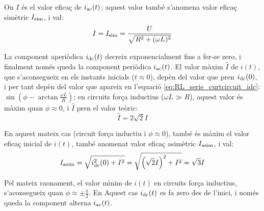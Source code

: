 On $I$ \'{e}s el valor efica\c{c} de $i_\mathrm{ac}(t)$; aquest valor tamb\'{e} s'anomena valor efica\c{c} sim\`{e}tric $I_\mathrm{sim}$, i val:
\begin{equation}
    I = I_\mathrm{sim} =\frac{U}{\sqrt{R^2+(\omega L)^2}}
    \label{eq:RL_serie_curtcircuit_I}
\end{equation}

La component aperi\`{o}dica $i_\mathrm{dc}(t)$ decreix exponencialment fins a fer-se zero, i finalment nom\'{e}s queda la component peri\`{o}dica $i_\mathrm{ac}(t)$. El valor m\`{a}xim $\hat{I}$ de $i(t)$, que s'aconsegueix en els instants inicials ($t\approx 0$), dep\`{e}n del valor que pren $i_\mathrm{dc}(0)$, i per tant dep\`{e}n del valor que apareix en l'equaci\'{o} \eqref{eq:RL_serie_curtcircuit_idc}: $\sin\left(\phi - \arctan\frac{\omega L}{R}\right)$; en circuits for\c{c}a inductius ($\omega L\gg R$), aquest valor \'{e}s m\`{a}xim quan $\phi \approx 0$, i $\hat{I}$ pren el valor te\`{o}ric:
\begin{equation}
    \hat{I} = 2 \sqrt{2} I
\end{equation}


En aquest mateix cas (circuit for\c{c}a inductiu i $\phi \approx 0$), tamb\'{e} \'{e}s m\`{a}xim el valor efica\c{c} inicial de $i(t)$, tamb\'{e} anomenat valor efica\c{c} asim\`{e}tric $I_\mathrm{asim}$,  i val:
\begin{equation}
    I_\mathrm{asim} = \sqrt{i_\mathrm{dc}^2(0) + I^2} = \sqrt{\left(\sqrt{2}I\right)^2 + I^2} = \sqrt{3} I
\end{equation}

Pel mateix raonament, el valor m\'{\i}nim de $i(t)$ en circuits for\c{c}a inductius, s'aconsegueix quan $\phi \approx \pm\frac{\pi}{2}$. En Aquest cas $i_\mathrm{dc}(t)$ es fa zero des de l'inici, i nom\'{e}s queda la component alterna $i_\mathrm{ac}(t)$.

